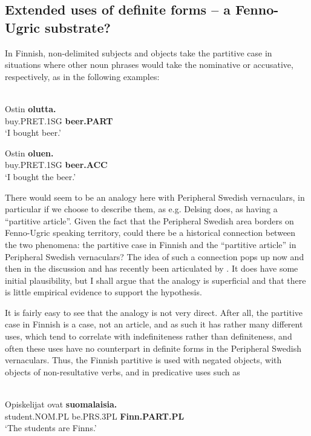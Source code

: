 \subsection{ Extended uses of definite forms – a Fenno-Ugric substrate?}

In Finnish, non-delimited subjects and objects take the partitive case in situations where other noun phrases would take the nominative or accusative, respectively, as in the following examples:

\ea\label{}
\\
\gll Ostin  \textbf{olutta.}\\
buy.PRET.1SG  \textbf{beer.PART}\\
\glt ‘I bought beer.’

\z

\ea
\gll Ostin  \textbf{oluen.}\\
buy.PRET.1SG  \textbf{beer.ACC}\\
\glt  ‘I bought the beer.’

\z

There would seem to be an analogy here with Peripheral Swedish vernaculars, in particular if we choose to describe them, as e.g. Delsing does, as having a “partitive article”. Given the fact that the Peripheral Swedish area borders on Fenno-Ugric speaking territory, could there be a historical connection between the two phenomena: the partitive case in Finnish and the “partitive article” in Peripheral Swedish vernaculars? The idea of such a connection pops up now and then in the discussion and has recently been articulated by \citet{Riesler2002}. It does have some initial plausibility, but I shall argue that the analogy is superficial and that there is little empirical evidence to support the hypothesis.

It is fairly easy to see that the analogy is not very direct. After all, the partitive case in Finnish is a case, not an article, and as such it has rather many different uses, which tend to correlate with indefiniteness rather than definiteness, and often these uses have no counterpart in definite forms in the Peripheral Swedish vernaculars. Thus, the Finnish partitive is used with negated objects, with objects of non-resultative verbs, and in predicative uses such as 

\ea \label{} 
\\
\gll Opiskelijat  ovat  \textbf{suomalaisia.}\\
student.NOM.PL  be.PRS.3PL  \textbf{Finn.PART.PL}\\
\glt ‘The students are Finns.’


